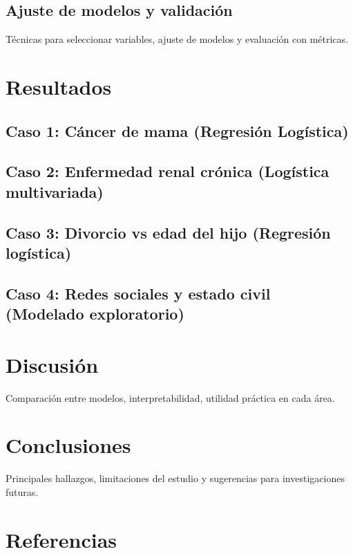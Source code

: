 \documentclass[12pt]{article}
\begin{document}
\subsection{Ajuste de modelos y validación}
Técnicas para seleccionar variables, ajuste de modelos y evaluación con métricas.

\section{Resultados}
\subsection{Caso 1: Cáncer de mama (Regresión Logística)}
\subsection{Caso 2: Enfermedad renal crónica (Logística multivariada)}
\subsection{Caso 3: Divorcio vs edad del hijo (Regresión logística)}
\subsection{Caso 4: Redes sociales y estado civil (Modelado exploratorio)}

\section{Discusión}
Comparación entre modelos, interpretabilidad, utilidad práctica en cada área.

\section{Conclusiones}
Principales hallazgos, limitaciones del estudio y sugerencias para investigaciones futuras.

\section*{Referencias}


\end{document}
